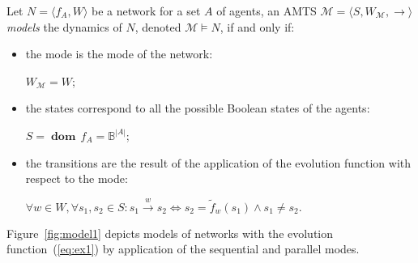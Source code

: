 \documentclass[12pt]{elsarticle}
\newcommand{\tuple}[1]{\langle #1 \rangle}
\newcommand{\Bset}[0]{\mathbb{B}}
\newcommand{\evo}[0]{\longrightarrow}
\newcommand{\xevo}[1]{\stackrel{#1}{\evo}}
\newcommand{\dom}[0]{\operatorname{\textbf{dom}}\,}
\begin{document}
\begin{definition}
\label{def:model}
Let $N=\tuple{f_A,W}$ be a network for a set $A$ of agents, an AMTS $\mathcal M=\tuple{S,W_{\mathcal M},\evo}$ \emph{models} the dynamics of $N$, denoted $ \mathcal M \models N$, if and only if:
\begin{itemize}
\item the mode is the mode of the network: 

$ W_{\mathcal M} = W$; 
\item the states correspond to all the possible Boolean states of the agents: 

$S =\dom f_A = \Bset^{|A|}$;
\item the transitions are the result of the application of the evolution function with respect to the mode:


$\forall w \in W, \forall s_1,s_2 \in S:s_1 \xevo w s_2 \iff s_2=\tilde f_w(s_1) \wedge s_1 \neq s_2.$
\end{itemize}
\end{definition}
Figure~\ref{fig:model1} depicts models of networks with the evolution function~(\ref{eq:ex1}) by application of the sequential and parallel modes. 
\end{document}
